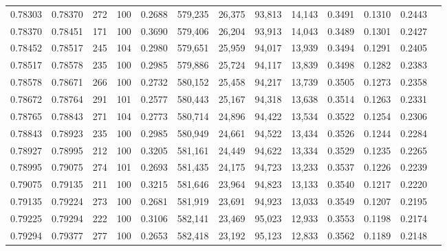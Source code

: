 \begin{tabular}{rrrrrrrrrrrrr}
0.78303 & 0.78370 &   272 & 100 &                                     0.2688 & 579,235 &  26,375 &  93,813 &  14,143 & 0.3491 & 0.1310 & 0.2443 \\
0.78370 & 0.78451 &   171 & 100 &                                     0.3690 & 579,406 &  26,204 &  93,913 &  14,043 & 0.3489 & 0.1301 & 0.2427 \\
0.78452 & 0.78517 &   245 & 104 &                                     0.2980 & 579,651 &  25,959 &  94,017 &  13,939 & 0.3494 & 0.1291 & 0.2405 \\
0.78517 & 0.78578 &   235 & 100 &                                     0.2985 & 579,886 &  25,724 &  94,117 &  13,839 & 0.3498 & 0.1282 & 0.2383 \\
0.78578 & 0.78671 &   266 & 100 &                                     0.2732 & 580,152 &  25,458 &  94,217 &  13,739 & 0.3505 & 0.1273 & 0.2358 \\
0.78672 & 0.78764 &   291 & 101 &                                     0.2577 & 580,443 &  25,167 &  94,318 &  13,638 & 0.3514 & 0.1263 & 0.2331 \\
0.78765 & 0.78843 &   271 & 104 &                                     0.2773 & 580,714 &  24,896 &  94,422 &  13,534 & 0.3522 & 0.1254 & 0.2306 \\
0.78843 & 0.78923 &   235 & 100 &                                     0.2985 & 580,949 &  24,661 &  94,522 &  13,434 & 0.3526 & 0.1244 & 0.2284 \\
0.78927 & 0.78995 &   212 & 100 &                                     0.3205 & 581,161 &  24,449 &  94,622 &  13,334 & 0.3529 & 0.1235 & 0.2265 \\
0.78995 & 0.79075 &   274 & 101 &                                     0.2693 & 581,435 &  24,175 &  94,723 &  13,233 & 0.3537 & 0.1226 & 0.2239 \\
0.79075 & 0.79135 &   211 & 100 &                                     0.3215 & 581,646 &  23,964 &  94,823 &  13,133 & 0.3540 & 0.1217 & 0.2220 \\
0.79135 & 0.79224 &   273 & 100 &                                     0.2681 & 581,919 &  23,691 &  94,923 &  13,033 & 0.3549 & 0.1207 & 0.2195 \\
0.79225 & 0.79294 &   222 & 100 &                                     0.3106 & 582,141 &  23,469 &  95,023 &  12,933 & 0.3553 & 0.1198 & 0.2174 \\
0.79294 & 0.79377 &   277 & 100 &                                     0.2653 & 582,418 &  23,192 &  95,123 &  12,833 & 0.3562 & 0.1189 & 0.2148 \\

\end{tabular}

